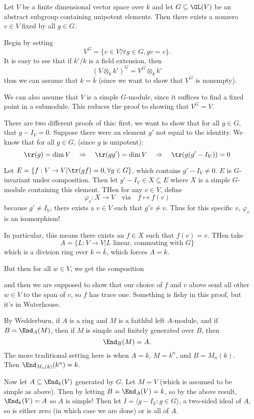 \documentclass[12pt]{article}
\begin{document}
\begin{thm}
	Let $V$ be a finite dimensional vector space over $k$ and let $G\subseteq \GL(V)$ be an abstract subgroup containing unipotent elements.
	Then there exists a nonzero $v\in V$ fixed by all $g\in G$.
\end{thm}
\begin{prf}
	Begin by setting 
	\[V^G=\{v\in V|\forall g\in G, gv=v\}.\]
	It is easy to see that if $k'/k$ is a field extension, then 
	\[(V\otimes_k k')^G=V^G\otimes_k k'\]
	thus we can assume that $k=\bar k$ (since we want to show that $V^G$ is nonempty).

	We can also assume that $V$ is a simple $G$-module, since it suffices to find a fixed point in a submodule.
	This reduces the proof to showing that $V^G=V$.

	There are two different proofs of this: first, we want to show that for all $g\in G$, that $g-I_V=0$. Suppose there were 
	an element $g'$ not equal to the identity. We know that for all $g\in G$, (since $g$ is unipotent):
	\[\tr (g)=\dim V\quad\Rightarrow\quad \tr(gg')=\dim V\quad\Rightarrow\quad \tr(g(g'-I_V))=0\]
	
	Let $E=\{f:V\to V|\tr(gf)=0,\forall g\in G\}$, which contains $g'-I_V\ne 0$. $E$ is $G$-invariant under composition.
	Then let $g'-I_V\in X\subseteq E$ where $X$ is a simple $G$-module containing this element. THen for any $v\in V$, define 
	\[\varphi_v:X\to V\quad\text{via}\quad f\mapsto f(v)\]
	because $g'\ne I_V$, there exists a $v\in V$ such that $g'v\ne v$. Thus for this specific $v$, $\varphi_v$ is an isomorphism!

	In particular, this means there exists an $f\in X$ such that $f(v)=v$. THen take 
	\[A=\{L:V\to V| L\text{ linear, commuting with $G$}\}\]
	which is a division ring over $k=\bar k$, which forces $A=k$.

	But then for all $w\in V$, we get the composition 
	\begin{center}
	\end{center}
	and then we are supposed to show that our choice of $f$ and $v$ above send all other $w\in V$ to the span of $v$,
	so $f$ has trace one. Something is fishy in this proof, but it's in Waterhouse.
\end{prf}
\begin{prf}
	By Wedderburn, if $A$ is a ring and $M$ is a faithful left $A$-module, and if $B=\End_A(M)$, then if $M$ is simple and finitely generated over $B$, 
	then 
	\[\End_B(M)=A.\]
	The more traditional setting here is when $A=k$, $M=k^n$, and $B=M_n(k)$. Then $\End_{M_n(k)}(k^n)=k.$

	Now let $A\subseteq \End_k(V)$ generated by $G$. Let $M=V$ (which is assumed to be simple as above). Then by letting $B=\End_A(V)=k$, so by the above 
	result, $\End_k(V)=A$ so $A$ is simple! Then let $I=\langle g-I_V:g\in G\rangle$, a two-sided ideal of $A$, so is either zero (in which case we are done) or is all of $A$.

	
\end{prf}
\end{document}
